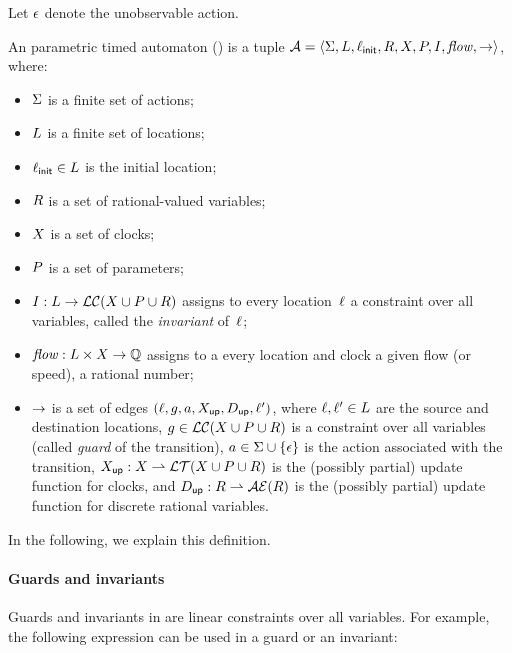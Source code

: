 Let $\epsilon$ denote the unobservable action.

\begin{definition}[\IPTA{}]\label{definition:IPTA}
	An \imitator{} parametric timed automaton (\emph{\IPTA{}}) is a tuple $\mathcal{A} = \langle\Sigma, L, \ell_{\textsf{init}}, R, X, P, I, \mathit{flow}, {\rightarrow}\rangle$, where:
	\begin{itemize}
		\item $\Sigma$ is a finite set of actions;
		\item $L$ is a finite set of locations;
		\item $\ell_{\textsf{init}} \in L$ is the initial location;
		\item $R$ is a set of rational-valued variables;
		\item $X$ is a set of clocks;
		\item $P$ is a set of parameters;
		\item $I : L \rightarrow \mathcal{LC}(X \cup P \cup R)$ assigns to every location~$\ell$ a constraint over all variables, called the \emph{invariant} of~$\ell$;
		\item $\mathit{flow} : L \times X \rightarrow \mathbb Q$ assigns to a every location and clock a given flow (or speed), \ie{} a rational number;
		\item ${\rightarrow}$ is a set of edges $(\ell, g, a, X_\mathsf{up}, D_\mathsf{up}, \ell')$, where
		      $\ell, \ell' \in L$ are the source and destination locations,
		      $g \in \mathcal{LC}(X \cup P \cup R)$ is a constraint over all variables (called \emph{guard} of the transition),
		      $a \in \Sigma \cup \{ \epsilon \}$ is the action associated with the transition,
		      $X_\mathsf{up} : X \rightharpoonup \mathcal{LT}(X \cup P \cup R)$ is the (possibly partial) update function for clocks, and
		      $D_\mathsf{up} : R \rightharpoonup \mathcal{AE}(R)$ is the (possibly partial) update function for discrete rational variables.
	\end{itemize}
\end{definition}

In the following, we explain this definition.

\paragraph{Guards and invariants}
Guards and invariants in \imitator{} are linear constraints over all variables.
For example, the following expression can be used in a guard or an invariant:

